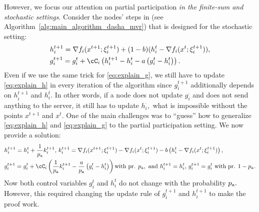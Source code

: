 \documentclass{article}
\newcommand{\algorithmname}{DASHA-PP}
\newcommand*{\probavailable}{\ensuremath{p_{\textnormal{a}}}}
\begin{document}
However, we focus our attention on partial participation \emph{in the finite-sum and stochastic settings}. Consider the nodes' steps in  (see Algorithm~\ref{alg:main_algorithm_dasha_mvr}) that is designed for the stochastic setting:
\begin{align}
  &h^{t+1}_i = \nabla f_i(x^{t+1};\xi^{t+1}_{i}) + (1 - b) (h^t_i - \nabla f_i(x^{t};\xi^{t+1}_{i})), \label{eq:explain_h}\\
  &g^{t+1}_i = g^{t}_i + \cC_i\left(h^{t+1}_i - h^{t}_i - a \left(g^{t}_i - h^{t}_i\right)\right). \label{eq:explain_g}
\end{align}
Even if we use the same trick for \eqref{eq:explain_g}, we still have to update \eqref{eq:explain_h} in every iteration of the algorithm since $g^{t+1}_i$ additionally depends on $h^{t+1}_i$ and $h^{t}_i.$ In other words, if a node does not update $g_i^{\cdot}$ and does not send anything to the server, it still has to update $h^{\cdot}_i,$ what is impossible without the points $x^{t+1}$ and $x^{t}.$
One of the main challenges was to ``guess'' how to generalize \eqref{eq:explain_h} and \eqref{eq:explain_g} to the partial participation setting. We now provide a solution:
\begin{align}
  & h^{t+1}_i = h^t_i + \frac{1}{\probavailable}k^{t+1}_i, \,k^{t+1}_i = \nabla f_i(x^{t+1};\xi^{t+1}_{i}) - \nabla f_i(x^{t};\xi^{t+1}_{i}) - b \left(h^t_i - \nabla f_i(x^{t};\xi^{t+1}_{i})\right), \label{eq:explain_h_new}\\
  & g^{t+1}_i = g^{t}_i + \cC_i\left(\frac{1}{\probavailable}k^{t+1}_i - \frac{a}{\probavailable} \left(g^{t}_i - h^{t}_i\right)\right) \textnormal{with pr. } \probavailable, \textnormal{ and } h^{t+1}_i = h^{t}_i,\, g^{t+1}_i = g^{t}_i \textnormal{ with pr. } 1 - \probavailable. \nonumber
\end{align}
Now both control variables $g_i^{t}$ and $h_i^{t}$ do not change with the probability $\probavailable.$ However, this required changing the update rule of $g_i^{t+1}$ and $h_i^{t+1}$ to make the proof work.
\end{document}
